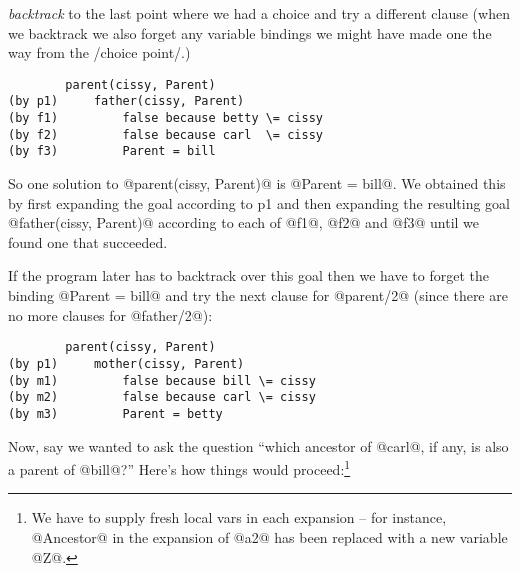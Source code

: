 \documentclass[a4paper,11pt,notitlepage,onecolumn]{article}
\begin{document}
\emph{backtrack} to the last point where we had a choice and try a
different clause (when we backtrack we also forget any
variable bindings we might have made one the way from the
/choice point/.)
\begin{verbatim}
        parent(cissy, Parent)
(by p1)     father(cissy, Parent)
(by f1)         false because betty \= cissy
(by f2)         false because carl  \= cissy
(by f3)         Parent = bill
\end{verbatim}
So one solution to @parent(cissy, Parent)@ is @Parent = bill@.  We
obtained this by first expanding the goal according to p1 and
then expanding the resulting goal @father(cissy, Parent)@
according to each of @f1@, @f2@ and @f3@ until we found one that
succeeded.

If the program later has to backtrack over this goal then we
have to forget the binding @Parent = bill@ and try the next
clause for @parent/2@ (since there are no more clauses for
@father/2@):
\begin{verbatim}
        parent(cissy, Parent)
(by p1)     mother(cissy, Parent)
(by m1)         false because bill \= cissy
(by m2)         false because carl \= cissy
(by m3)         Parent = betty
\end{verbatim}
Now, say we wanted to ask the question ``which ancestor of
@carl@, if any, is also a parent of @bill@?''  Here's how things
would proceed:\footnote{We have to supply fresh local vars in each
 expansion -- for instance, @Ancestor@ in the expansion of @a2@ has
 been replaced with a new variable @Z@.}
\end{document}
